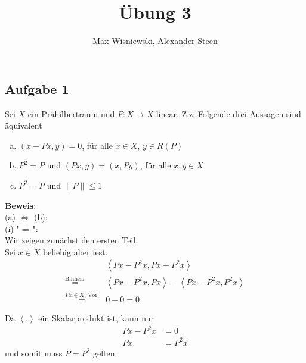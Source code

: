 \documentclass[11pt,a4paper,ngerman]{article}
\date{}
\title{Übung 3}
\author{Max Wisniewski, Alexander Steen}
\begin{document}

\renewcommand{\figurename}{Figure}

\maketitle
\thispagestyle{fancy}

\subsection*{Aufgabe 1}
Sei $X$ ein Prähilbertraum und $P: X \to X$ linear. Z.z: Folgende drei Aussagen sind äquivalent
\begin{enumerate}[(a)]
\item $(x-Px,y) = 0$, für alle $x \in X$, $y \in R(P)$ 
\item $P^2 = P$ und $(Px,y) = (x,Py)$, für alle $x,y \in X$ 
\item $P^2 = P$ und $\|P\| \leq 1$
\end{enumerate}
\textbf{Beweis}:\\
(a) $\Leftrightarrow$ (b): \\
(i) "$\Rightarrow$": \\
Wir zeigen zunächst den ersten Teil.\\
Sei $x \in X$ beliebig aber fest.
\begin{equation*}\begin{array}{rl}
& \left\langle Px - P^2 x, Px - P^2 x \right\rangle\\
\stackrel{\text{Bilinear}}{=}&
    \left\langle Px - P^2 x, Px \right\rangle - \left\langle Px - P^2 x, P^2 x\right\rangle\\
\stackrel{Px \in X\text{, Vor.}}{=}&
    0 - 0 = 0
\end{array}\end{equation*}

Da $\left\langle . \right\rangle$ ein Skalarprodukt ist, kann nur
\begin{equation*}\begin{split}
    Px - P^2 x &= 0\\
    Px      &= P^2 x
\end{split}\end{equation*}
und somit muss $P = P^2$ gelten.\\
\end{document}
